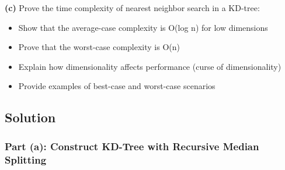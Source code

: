 \documentclass[12pt]{article}
\begin{document}
\textbf{(c)} Prove the time complexity of nearest neighbor search in a KD-tree:
\begin{itemize}
    \item Show that the average-case complexity is O(log n) for low dimensions
    \item Prove that the worst-case complexity is O(n)
    \item Explain how dimensionality affects performance (curse of dimensionality)
    \item Provide examples of best-case and worst-case scenarios
\end{itemize}

\hrulefill

\subsection{Solution}

\subsubsection{Part (a): Construct KD-Tree with Recursive Median Splitting}
\end{document}
